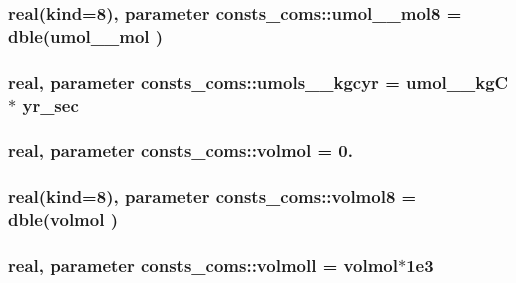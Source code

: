 \subsubsection[{\texorpdfstring{umol\+\_\+2\+\_\+mol8}{umol_2_mol8}}]{\setlength{\rightskip}{0pt plus 5cm}real(kind=8), parameter consts\+\_\+coms\+::umol\+\_\+\_\+mol8 = dble({\bf umol\+\_\+\_\+mol} )}\hypertarget{namespaceconsts__coms_a1985bdf9dc2233ee0743d4c1f340d8ae}{}\label{namespaceconsts__coms_a1985bdf9dc2233ee0743d4c1f340d8ae}
\subsubsection[{\texorpdfstring{umols\+\_\+2\+\_\+kgcyr}{umols_2_kgcyr}}]{\setlength{\rightskip}{0pt plus 5cm}real, parameter consts\+\_\+coms\+::umols\+\_\+\_\+kgcyr = umol\+\_\+\_\+kgC $\ast$ {\bf yr\+\_\+sec}}\hypertarget{namespaceconsts__coms_a80027bcbb9d21498f86d1dc0d0c856e9}{}\label{namespaceconsts__coms_a80027bcbb9d21498f86d1dc0d0c856e9}
\subsubsection[{\texorpdfstring{volmol}{volmol}}]{\setlength{\rightskip}{0pt plus 5cm}real, parameter consts\+\_\+coms\+::volmol = 0.}\hypertarget{namespaceconsts__coms_a2c08b6494703da0637aaf244befddfe2}{}\label{namespaceconsts__coms_a2c08b6494703da0637aaf244befddfe2}
\subsubsection[{\texorpdfstring{volmol8}{volmol8}}]{\setlength{\rightskip}{0pt plus 5cm}real(kind=8), parameter consts\+\_\+coms\+::volmol8 = dble({\bf volmol} )}\hypertarget{namespaceconsts__coms_a2f3906a20f2db696a3a274df51b36123}{}\label{namespaceconsts__coms_a2f3906a20f2db696a3a274df51b36123}
\subsubsection[{\texorpdfstring{volmoll}{volmoll}}]{\setlength{\rightskip}{0pt plus 5cm}real, parameter consts\+\_\+coms\+::volmoll = {\bf volmol}$\ast$1e3}\hypertarget{namespaceconsts__coms_a8931f8cd781a8b09d11212c651fec485}{}\label{namespaceconsts__coms_a8931f8cd781a8b09d11212c651fec485}
